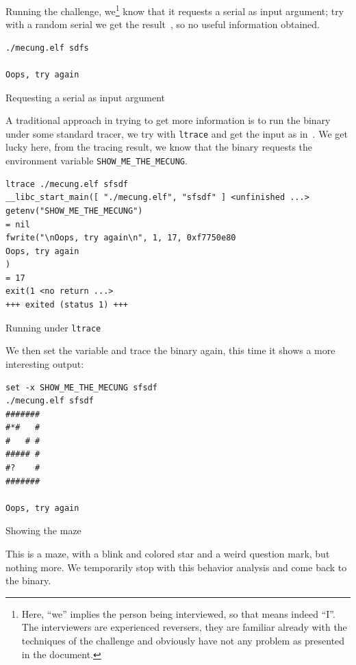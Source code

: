 \documentclass{easychair}
\begin{document}
Running the challenge, we\footnote{Here, ``we'' implies the person being interviewed, so that means indeed ``I''. The interviewers are experienced reversers, they are familiar already with the techniques of the challenge and obviously have not any problem as presented in the document.} know that it requests a serial as input argument; try with a random serial we get the result~, so no useful information obtained.
\begin{listing}[h]
  \begin{verbatim}
./mecung.elf sdfs

Oops, try again
  \end{verbatim}
  \caption{Requesting a serial as input argument}
  \label{fig:serial_request}
\end{listing}
A traditional approach in trying to get more information is to run the binary under some standard tracer, we try with \texttt{ltrace} and get the input as in~. We get lucky here, from the tracing result, we know that the binary requests the environment variable \texttt{SHOW\_ME\_THE\_MECUNG}.
\begin{listing}[h]
  \begin{verbatim}
ltrace ./mecung.elf sfsdf
__libc_start_main([ "./mecung.elf", "sfsdf" ] <unfinished ...>
getenv("SHOW_ME_THE_MECUNG")                                                                                           = nil
fwrite("\nOops, try again\n", 1, 17, 0xf7750e80
Oops, try again
)                                                                       = 17
exit(1 <no return ...>
+++ exited (status 1) +++
  \end{verbatim}
  \caption{Running under \texttt{ltrace}}
  \label{fig:running_ltrace}
\end{listing}
We then set the variable and trace the binary again, this time it shows a more interesting output:
\begin{listing}[h]
  \begin{verbatim}
set -x SHOW_ME_THE_MECUNG sfsdf
./mecung.elf sfsdf
#######
#*#   #
#   # #
##### #
#?    #
#######

Oops, try again
  \end{verbatim}
  \caption{Showing the maze}
  \label{fig:show_maze}
\end{listing}

This is a maze, with a blink and colored star and a weird question mark, but nothing more. We temporarily stop with this behavior analysis and come back to the binary.
\end{document}
